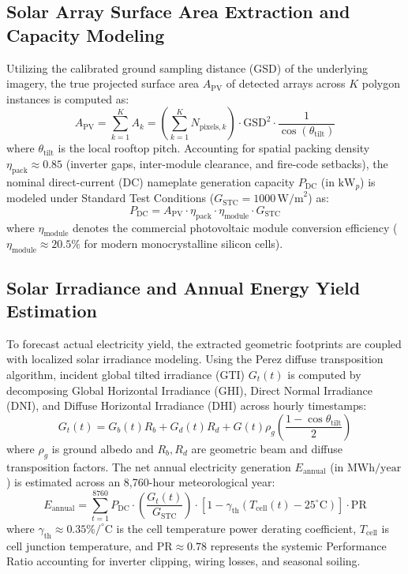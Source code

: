 \documentclass[conference]{IEEEtran}
\begin{document}
\subsection{Solar Array Surface Area Extraction and Capacity Modeling}
Utilizing the calibrated ground sampling distance (GSD) of the underlying imagery, the true projected surface area $A_{\text{PV}}$ of detected arrays across $K$ polygon instances is computed as:
\begin{equation}
A_{\text{PV}} = \sum_{k=1}^K A_k = \left( \sum_{k=1}^K N_{\text{pixels}, k} \right) \cdot \text{GSD}^2 \cdot \frac{1}{\cos(\theta_{\text{tilt}})}
\end{equation}
where $\theta_{\text{tilt}}$ is the local rooftop pitch. Accounting for spatial packing density $\eta_{\text{pack}} \approx 0.85$ (inverter gaps, inter-module clearance, and fire-code setbacks), the nominal direct-current (DC) nameplate generation capacity $P_{\text{DC}}$ (in $\text{kW}_p$) is modeled under Standard Test Conditions ($G_{\text{STC}} = 1000\,\text{W/m}^2$) as:
\begin{equation}
P_{\text{DC}} = A_{\text{PV}} \cdot \eta_{\text{pack}} \cdot \eta_{\text{module}} \cdot G_{\text{STC}}
\end{equation}
where $\eta_{\text{module}}$ denotes the commercial photovoltaic module conversion efficiency ($\eta_{\text{module}} \approx 20.5\%$ for modern monocrystalline silicon cells).

\subsection{Solar Irradiance and Annual Energy Yield Estimation}
To forecast actual electricity yield, the extracted geometric footprints are coupled with localized solar irradiance modeling. Using the Perez diffuse transposition algorithm, incident global tilted irradiance (GTI) $G_t(t)$ is computed by decomposing Global Horizontal Irradiance (GHI), Direct Normal Irradiance (DNI), and Diffuse Horizontal Irradiance (DHI) across hourly timestamps:
\begin{equation}
G_t(t) = G_b(t) R_b + G_d(t) R_d + G(t) \rho_g \left(\frac{1 - \cos\theta_{\text{tilt}}}{2}\right)
\end{equation}
where $\rho_g$ is ground albedo and $R_b, R_d$ are geometric beam and diffuse transposition factors. The net annual electricity generation $E_{\text{annual}}$ (in $\text{MWh/year}$) is estimated across an 8,760-hour meteorological year:
\begin{equation}
E_{\text{annual}} = \sum_{t=1}^{8760} P_{\text{DC}} \cdot \left(\frac{G_t(t)}{G_{\text{STC}}}\right) \cdot \left[1 - \gamma_{\text{th}} (T_{\text{cell}}(t) - 25^\circ\text{C})\right] \cdot \text{PR}
\end{equation}
where $\gamma_{\text{th}} \approx 0.35\%/^\circ\text{C}$ is the cell temperature power derating coefficient, $T_{\text{cell}}$ is cell junction temperature, and $\text{PR} \approx 0.78$ represents the systemic Performance Ratio accounting for inverter clipping, wiring losses, and seasonal soiling.
\end{document}
